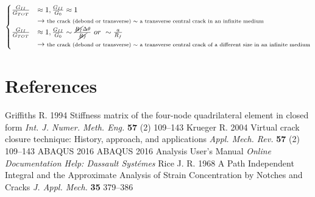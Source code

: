 \documentclass[a4paper]{jpconf}
\begin{document}
\begin{equation}
\begin{cases}
\frac{G_{II}}{G_{TOT}}&\approx 1, \frac{G_{II}}{G_{0}}\approx 1\\ &\rightarrow\text{\scriptsize the crack (debond or transverse) $\sim$ a transverse central crack in an infinite medium}\\
\frac{G_{II}}{G_{TOT}}&\approx 1, \frac{G_{II}}{G_{0}}\sim\frac{\cancel{R_{f}}\Delta\theta}{\cancel{R_{f}}}\ or\  \sim\frac{a}{R_{f}}\\ &\rightarrow\text{\scriptsize the crack (debond or transverse) $\sim$ a transverse central crack of a different size in an infinite medium}\\
\end{cases}
\end{equation}






\section*{References}
\begin{thebibliography}{9}
Griffiths  R. 1994 Stiffness matrix of the four-node quadrilateral element in closed form {\it Int. J. Numer. Meth. Eng.} {\bf 57} (2) 109--143
Krueger R. 2004 Virtual crack closure technique: History, approach, and applications {\it Appl. Mech. Rev.} {\bf 57} (2) 109--143
 ABAQUS 2016 ABAQUS 2016 Analysis User's Manual {\it Online Documentation Help: Dassault Syst\'emes}
Rice J. R. 1968 A Path Independent Integral and the Approximate Analysis of Strain Concentration by Notches and Cracks {\it J. Appl. Mech.} {\bf 35} 379--386

\end{thebibliography}
\end{document}
